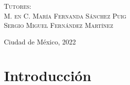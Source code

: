 \documentclass[letterpaper,12pt,oneside]{book}
\begin{document}
\begin{titlepage}
\begin{minipage}[c][0.81\textheight][t]{0.75\textwidth}
\begin{center}
                \vspace{0.5cm}

                {\large\scshape Tutores:\\[0.3cm] {M. en C. María Fernanda Sánchez Puig \\ 
Sergio Miguel Fernández Martínez}}\\[.2in]

                \vspace{0.5cm}

                \large{Ciudad de México,}{ }{2022}
            \end{center}
        \end{minipage}
    \end{titlepage}

\frontmatter
\tableofcontents

\mainmatter


\section{Introducción}

\backmatter%
\end{document}
